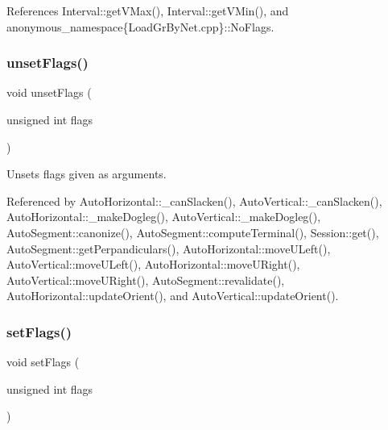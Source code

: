References Interval\+::get\+V\+Max(), Interval\+::get\+V\+Min(), and anonymous\+\_\+namespace\{\+Load\+Gr\+By\+Net.\+cpp\}\+::\+No\+Flags.

\mbox{\label{classKatabatic_1_1AutoSegment_a1a6fac115cb81db48e3ac9ffa0721bb5}} 
\subsubsection{\texorpdfstring{unset\+Flags()}{unsetFlags()}}
{\footnotesize\ttfamily void unset\+Flags (\begin{DoxyParamCaption}\item[{unsigned int}]{flags }\end{DoxyParamCaption})\hspace{0.3cm}{\ttfamily [inline]}}

Unsets {\ttfamily flags} given as arguments. 

Referenced by Auto\+Horizontal\+::\+\_\+can\+Slacken(), Auto\+Vertical\+::\+\_\+can\+Slacken(), Auto\+Horizontal\+::\+\_\+make\+Dogleg(), Auto\+Vertical\+::\+\_\+make\+Dogleg(), Auto\+Segment\+::canonize(), Auto\+Segment\+::compute\+Terminal(), Session\+::get(), Auto\+Segment\+::get\+Perpandiculars(), Auto\+Horizontal\+::move\+U\+Left(), Auto\+Vertical\+::move\+U\+Left(), Auto\+Horizontal\+::move\+U\+Right(), Auto\+Vertical\+::move\+U\+Right(), Auto\+Segment\+::revalidate(), Auto\+Horizontal\+::update\+Orient(), and Auto\+Vertical\+::update\+Orient().

\mbox{\label{classKatabatic_1_1AutoSegment_aeb14f94914af58657a0dc2f50ec98df5}} 
\subsubsection{\texorpdfstring{set\+Flags()}{setFlags()}}
{\footnotesize\ttfamily void set\+Flags (\begin{DoxyParamCaption}\item[{unsigned int}]{flags }\end{DoxyParamCaption})\hspace{0.3cm}{\ttfamily [inline]}}

